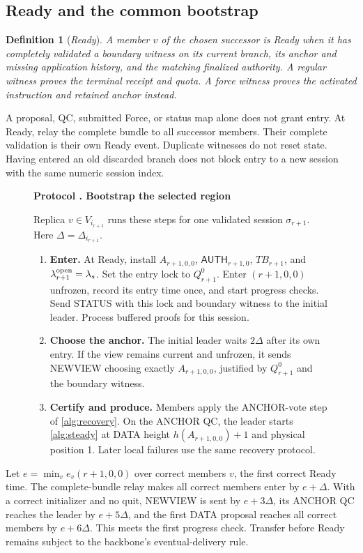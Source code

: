 \documentclass[11pt,a4paper]{article}
\newcommand{\TB}{\mathit{TB}}
\newcommand{\tagg}[1]{\ensuremath{\mathsf{#1}}}
\newcommand{\defterm}[1]{\textcolor{rrBlue}{\textit{#1}}}
\newtheorem{definition}{Definition}[section]
\newcounter{protocol}
\newenvironment{protocol}[2]{\begin{figure}[htbp]\refstepcounter{protocol}\label{#1}
\begin{mdframed}[linewidth=.6pt,skipabove=0pt,skipbelow=0pt,
innertopmargin=7pt,innerbottommargin=7pt]\small
\textbf{Protocol \theprotocol. #2}\par\smallskip}{\end{mdframed}\end{figure}}
\begin{document}
\subsection{Ready and the common bootstrap}
\label{sec:ready}
\begin{definition}[\defterm{Ready}]
\label{def:ready}
A member $v$ of the chosen successor is \defterm{Ready} when it has completely
validated a boundary witness on its current branch, its
anchor and missing application history, and the matching finalized
authority.
A regular witness proves the terminal receipt and quota. A force
witness proves the activated instruction and retained anchor instead.
\end{definition}
A proposal, QC, submitted Force, or status map alone does not grant entry.
At Ready, relay the complete bundle to all successor members. Their
complete validation is their own Ready event. Duplicate witnesses do
not reset state. Having entered an old discarded branch does not block
entry to a new session with the same numeric session index.

\begin{protocol}{alg:bootstrap}{Bootstrap the selected region}
Replica $v\in V_{i_{r+1}}$ runs these steps for one validated
session $\sigma_{r+1}$.
Here $\Delta=\Delta_{i_{r+1}}$.
\begin{enumerate}[label=\textbf{\arabic*)},itemsep=3pt]
\item \textbf{Enter.} At Ready, install $A_{r+1,0,0}$,
$\tagg{AUTH}_{r+1,0}$, $\TB_{r+1}$, and $\lambda^{\rm
open}_{r+1}=\lambda_s$. Set the entry lock
to $Q^0_{r+1}$. Enter $(r+1,0,0)$ unfrozen, record its entry time once,
and start progress checks. Send STATUS with this lock and boundary
witness to the initial leader. Process buffered proofs for this session.
\item \textbf{Choose the anchor.} The initial leader waits $2\Delta$
after its own entry. If the view remains current and unfrozen, it sends
NEWVIEW choosing exactly $A_{r+1,0,0}$, justified by $Q^0_{r+1}$ and
the boundary witness.
\item \textbf{Certify and produce.} Members apply the ANCHOR-vote step
of \cref{alg:recovery}. On the ANCHOR QC, the leader starts
\cref{alg:steady} at DATA height $h(A_{r+1,0,0})+1$ and physical
position 1. Later local failures use the same recovery protocol.
\end{enumerate}
\end{protocol}

Let $e=\min_v e_v(r+1,0,0)$ over correct members $v$, the
first correct Ready time. The complete-bundle relay makes
all correct members enter by $e+\Delta$. With a correct initializer and
no quit, NEWVIEW is sent by $e+3\Delta$, its ANCHOR QC reaches the
leader by $e+5\Delta$, and the first DATA proposal reaches all correct
members by $e+6\Delta$. This meets the first progress check. Transfer
before Ready remains subject to the backbone's eventual-delivery rule.
\end{document}
